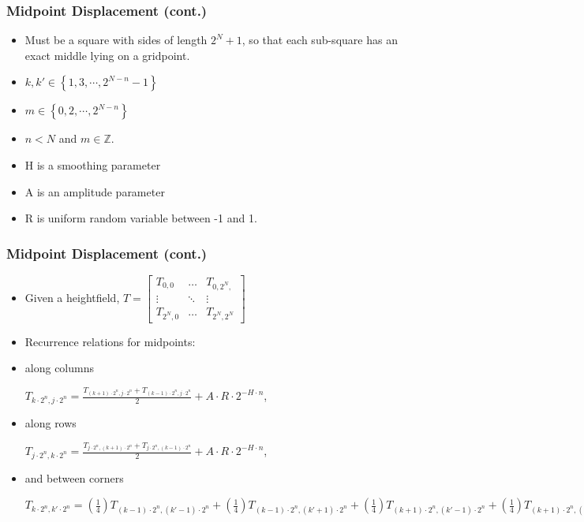 \documentclass{beamer}
\begin{document}
\begin{frame}
\frametitle{Midpoint Displacement (cont.)}
\begin{itemize}
 \item Must be a square with sides of length $2^{N}+1$, so that each sub-square has an exact middle lying on a gridpoint.
 \item $k,k' \in \left\{ 1, 3, \cdots, 2^{N-n}-1 \right\}$
 \item $m \in \left\{ 0, 2, \cdots, 2^{N-n} \right\}$
  \item $n < N$ and $m \in \mathbb{Z}$.
 \item H is a smoothing parameter
 \item A is an amplitude parameter
 \item R is uniform random variable between -1 and 1.
\end{itemize}
\end{frame}

\begin{frame}
\frametitle{Midpoint Displacement (cont.)}
\begin{itemize}
 \item Given a heightfield,
		$T = \left[ \begin{matrix}
		T_{0,0} & \ldots & T_{0,2^{N},} \\
		\vdots  &  \ddots & \vdots \\
		T_{2^{N},0} & \ldots & T_{2^{N},2^{N}}
		\end{matrix} \right]$
 \item Recurrence relations for midpoints:
		\item along columns
		
		$T_{k \cdot 2^{n},j \cdot 2^{n}} = \frac{T_{(k+1) \cdot 2^{n},j \cdot 2^{n}} + T_{(k-1) \cdot 2^{n},j \cdot 2^{n}}}{2} + A \cdot R \cdot 2^{-H \cdot n}$,
		\item along rows
		
		$T_{j \cdot 2^{n},k \cdot 2^{n}} = \frac{T_{j \cdot 2^{n},(k+1) \cdot 2^{n}} + T_{j \cdot 2^{n},(k-1) \cdot 2^{n}}}{2} + A \cdot R \cdot 2^{-H \cdot n}$,
		\item and between corners
		
		$T_{k \cdot 2^{n},k' \cdot 2^{n}} = \left(\frac{1}{4}\right)T_{(k-1) \cdot 2^{n},(k'-1) \cdot 2^{n}} + \left(\frac{1}{4}\right)T_{(k-1) \cdot 2^{n},(k'+1) \cdot 2^{n}} + \left(\frac{1}{4}\right)T_{(k+1) \cdot 2^{n},(k'-1) \cdot 2^{n}} + \left(\frac{1}{4}\right)T_{(k+1) \cdot 2^{n},(k'+1) \cdot 2^{n}} + A \cdot R \cdot 2^{-H \cdot n}$
\end{itemize}
\end{frame}
\end{document}
